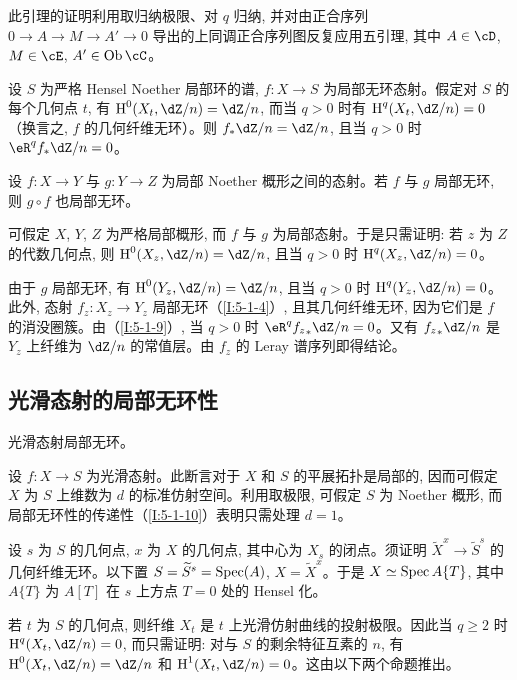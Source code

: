 此引理的证明利用取归纳极限、对 $q$ 归纳, 并对由正合序列 $0\to A\to M\to A'\to0$ 导出的上同调正合序列图反复应用五引理, 其中 $A\in\cD$, $M\in\cE$, $A'\in\ob\cC$。

\begin{corollary}\label{I:5-1-9}
设 $S$ 为严格 Hensel Noether 局部环的谱, $f:X\to S$ 为局部无环态射。假定对 $S$ 的每个几何点 $t$, 有 $\h^0(X_t,\dZ/n)=\dZ/n$, 而当 $q>0$ 时有 $\h^q(X_t,\dZ/n)=0$（换言之, $f$ 的几何纤维无环）。则 $f_*\dZ/n=\dZ/n$, 且当 $q>0$ 时 $\eR^qf_*\dZ/n=0$。
\end{corollary}

\begin{corollary}\label{I:5-1-10}
设 $f:X\to Y$ 与 $g:Y\to Z$ 为局部 Noether 概形之间的态射。若 $f$ 与 $g$ 局部无环, 则 $g\circ f$ 也局部无环。
\end{corollary}

可假定 $X$, $Y$, $Z$ 为严格局部概形, 而 $f$ 与 $g$ 为局部态射。于是只需证明: 若 $z$ 为 $Z$ 的代数几何点, 则 $\h^0(X_z,\dZ/n)=\dZ/n$, 且当 $q>0$ 时 $\h^q(X_z,\dZ/n)=0$。

由于 $g$ 局部无环, 有 $\h^0(Y_z,\dZ/n)=\dZ/n$, 且当 $q>0$ 时 $\h^q(Y_z,\dZ/n)=0$。此外, 态射 $f_z:X_z\to Y_z$ 局部无环（\ref{I:5-1-4}）, 且其几何纤维无环, 因为它们是 $f$ 的消没圈簇。由（\ref{I:5-1-9}）, 当 $q>0$ 时 $\eR^q{f_z}_*\dZ/n=0$。又有 ${f_z}_*\dZ/n$ 是 $Y_z$ 上纤维为 $\dZ/n$ 的常值层。由 $f_z$ 的 Leray 谱序列即得结论。

\subsection{光滑态射的局部无环性}\label{I:5-2}

\begin{theorem}\label{I:5-2-1}
光滑态射局部无环。
\end{theorem}

设 $f:X\to S$ 为光滑态射。此断言对于 $X$ 和 $S$ 的平展拓扑是局部的, 因而可假定 $X$ 为 $S$ 上维数为 $d$ 的标准仿射空间。利用取极限, 可假定 $S$ 为 Noether 概形, 而局部无环性的传递性（\ref{I:5-1-10}）表明只需处理 $d=1$。

设 $s$ 为 $S$ 的几何点, $x$ 为 $X$ 的几何点, 其中心为 $X_s$ 的闭点。须证明 $\widetilde X^x\to\widetilde S^s$ 的几何纤维无环。以下置 $S=\widetilde S^s=\operatorname{Spec}(A)$, $X=\widetilde X^x$。于是 $X\simeq\operatorname{Spec} A\{T\}$, 其中 $A\{T\}$ 为 $A[T]$ 在 $s$ 上方点 $T=0$ 处的 Hensel 化。

若 $t$ 为 $S$ 的几何点, 则纤维 $X_t$ 是 $t$ 上光滑仿射曲线的投射极限。因此当 $q\geqslant2$ 时 $\h^q(X_t,\dZ/n)=0$, 而只需证明: 对与 $S$ 的剩余特征互素的 $n$, 有 $\h^0(X_t,\dZ/n)=\dZ/n$ 和 $\h^1(X_t,\dZ/n)=0$。这由以下两个命题推出。

